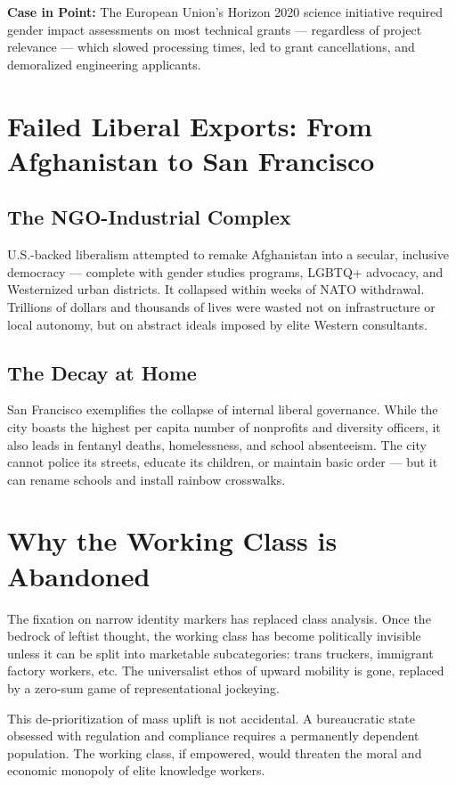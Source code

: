 \documentclass[11pt]{article}
\begin{document}
\textbf{Case in Point:} The European Union’s Horizon 2020 science initiative required gender impact assessments on most technical grants — regardless of project relevance — which slowed processing times, led to grant cancellations, and demoralized engineering applicants.

\section{Failed Liberal Exports: From Afghanistan to San Francisco}

\subsection{The NGO-Industrial Complex}

U.S.-backed liberalism attempted to remake Afghanistan into a secular, inclusive democracy — complete with gender studies programs, LGBTQ+ advocacy, and Westernized urban districts. It collapsed within weeks of NATO withdrawal. Trillions of dollars and thousands of lives were wasted not on infrastructure or local autonomy, but on abstract ideals imposed by elite Western consultants.

\subsection{The Decay at Home}

San Francisco exemplifies the collapse of internal liberal governance. While the city boasts the highest per capita number of nonprofits and diversity officers, it also leads in fentanyl deaths, homelessness, and school absenteeism. The city cannot police its streets, educate its children, or maintain basic order — but it can rename schools and install rainbow crosswalks.

\section{Why the Working Class is Abandoned}

The fixation on narrow identity markers has replaced class analysis. Once the bedrock of leftist thought, the working class has become politically invisible unless it can be split into marketable subcategories: trans truckers, immigrant factory workers, etc. The universalist ethos of upward mobility is gone, replaced by a zero-sum game of representational jockeying.

This de-prioritization of mass uplift is not accidental. A bureaucratic state obsessed with regulation and compliance requires a permanently dependent population. The working class, if empowered, would threaten the moral and economic monopoly of elite knowledge workers.
\end{document}
